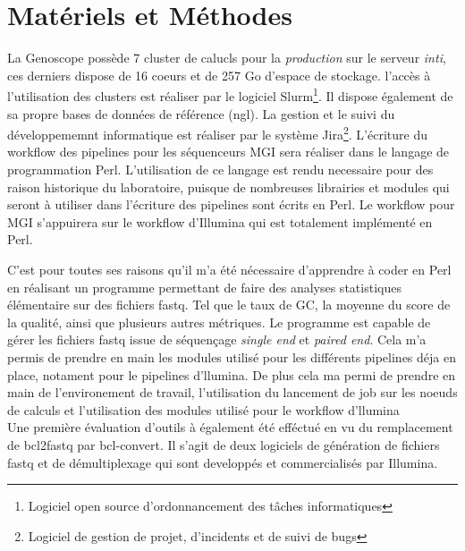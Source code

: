 \section{Matériels et Méthodes}

La Genoscope possède 7 cluster de calucls pour la \emph{production} sur le serveur \emph{inti}, ces derniers dispose de 16 coeurs et de 257 Go d'espace de stockage. l'accès à l'utilisation des clusters est réaliser par le logiciel Slurm\footnote{Logiciel open source d'ordonnancement des tâches informatiques}. Il dispose également de sa propre bases de données de référence (ngl). La gestion et le suivi du développememnt informatique est réaliser par le système Jira\footnote{Logiciel de gestion de projet, d'incidents et de suivi de bugs}. 
L'écriture du workflow des pipelines pour les séquenceurs MGI sera réaliser dans le langage de programmation Perl. L'utilisation de ce langage est rendu necessaire pour des raison historique du laboratoire, puisque de nombreuses librairies et modules qui seront à utiliser dans l'écriture des pipelines sont écrits en Perl. Le workflow pour MGI s'appuirera sur le workflow d'Illumina qui est totalement implémenté en Perl. 

C'est pour toutes ses raisons qu'il m'a été nécessaire d'apprendre à coder en Perl en réalisant un programme permettant de faire des analyses statistiques élémentaire sur des fichiers fastq. Tel que le taux de GC, la moyenne du score de la qualité, ainsi que plusieurs autres métriques. Le programme est capable de gérer les fichiers fastq issue de séquençage \emph{single end} et \emph{paired end}. Cela m'a permis de prendre en main les modules utilisé pour les différents pipelines déja en place, notament pour le pipelines d'llumina. De plus cela ma permi de prendre en main de l'environement de travail, l'utilisation du lancement de job sur les noeuds de calculs et l'utilisation des modules utilisé pour le workflow d'llumina\\

Une première évaluation d'outils à également été efféctué en vu du remplacement de bcl2fastq par bcl-convert. Il s'agit de deux logiciels de génération de fichiers fastq et de démultiplexage qui sont developpés et commercialisés par Illumina.

